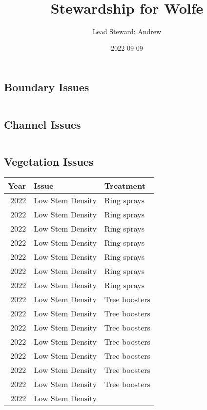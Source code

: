 \documentclass[
  landscape]{article}
\title{Stewardship for Wolfe}
\author{Lead Steward: Andrew}
\date{2022-09-09}
\begin{document}
\maketitle

\hypertarget{boundary-issues}{%
\subsection{Boundary Issues}\label{boundary-issues}}

\begin{tabular}{}
\hline

\hline
\end{tabular}

\hypertarget{channel-issues}{%
\subsection{Channel Issues}\label{channel-issues}}

\begin{tabular}{}
\hline

\hline
\end{tabular}

\hypertarget{vegetation-issues}{%
\subsection{Vegetation Issues}\label{vegetation-issues}}

\begin{tabular}{r|l|l}
\hline
Year & Issue & Treatment\\
\hline
2022 & Low Stem Density & Ring sprays\\
\hline
2022 & Low Stem Density & Ring sprays\\
\hline
2022 & Low Stem Density & Ring sprays\\
\hline
2022 & Low Stem Density & Ring sprays\\
\hline
2022 & Low Stem Density & Ring sprays\\
\hline
2022 & Low Stem Density & Ring sprays\\
\hline
2022 & Low Stem Density & Ring sprays\\
\hline
2022 & Low Stem Density & Tree boosters\\
\hline
2022 & Low Stem Density & Tree boosters\\
\hline
2022 & Low Stem Density & Tree boosters\\
\hline
2022 & Low Stem Density & Tree boosters\\
\hline
2022 & Low Stem Density & Tree boosters\\
\hline
2022 & Low Stem Density & Tree boosters\\
\hline
2022 & Low Stem Density & Tree boosters\\
\hline
2022 & Low Stem Density & \\
\hline
\end{tabular}
\end{document}
